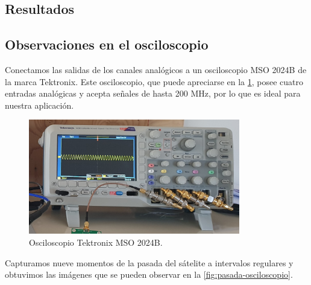 \documentclass{article}
\newenvironment{standalone}{\begin{preview}}{\end{preview}}
\begin{document}
\begin{standalone}
  \section{Resultados}

  \subsection{Observaciones en el osciloscopio}

  Conectamos las salidas de los canales analógicos a un osciloscopio MSO 2024B de la marca Tektronix.
  Este osciloscopio, que puede apreciarse en la \cref{fig:osciloscopio}, posee cuatro entradas analógicas y acepta señales de hasta 200 MHz, por lo que es ideal para nuestra aplicación.

  \begin{figure}[!htbp]
    \centering
    \includegraphics[width=\linewidth, height=50mm, keepaspectratio]{../images/osciloscopio.jpg}
    \caption{Osciloscopio Tektronix MSO 2024B.}
    \label{fig:osciloscopio}
  \end{figure}

  Capturamos nueve momentos de la pasada del sátelite a intervalos regulares y obtuvimos las imágenes que se pueden observar en la \cref{fig:pasada-osciloscopio}.

  \begin{figure}[!htbp]
    \centering


\end{figure}
\end{standalone}
\end{document}

